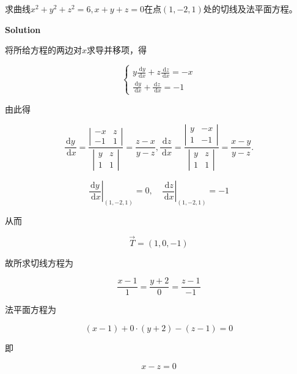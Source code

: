 \documentclass[12pt, a4paper]{article}
\numberwithin{equation}{section}
\begin{document}
    求曲线$x^2+y^2+z^2=6, x+y+z=0$在点\(\left(1,-2,1\right)\)处的切线及法平面方程。
    \vspace{1em}

    \textbf{Solution}
    \vspace{1em}

    将所给方程的两边对\(x\)求导并移项，得

    $$
        \left\{\begin{array}{l}
        y \frac{\mathrm{~d} y}{\mathrm{~d} x}+z \frac{\mathrm{~d} z}{\mathrm{~d} x}=-x \\
        \frac{\mathrm{~d} y}{\mathrm{~d} x}+\frac{\mathrm{d} z}{\mathrm{~d} x}=-1
        \end{array}\right.
    $$

    由此得

    $$
        \frac{\mathrm{d} y}{\mathrm{~d} x}=\frac{\left|\begin{array}{cc}
        -x & z \\
        -1 & 1
        \end{array}\right|}{\left|\begin{array}{ll}
        y & z \\
        1 & 1
        \end{array}\right|}=\frac{z-x}{y-z}, \frac{\mathrm{~d} z}{\mathrm{~d} x}=\frac{\left|\begin{array}{cc}
        y & -x \\
        1 & -1
        \end{array}\right|}{\left|\begin{array}{ll}
        y & z \\
        1 & 1
        \end{array}\right|}=\frac{x-y}{y-z} .
    $$

    $$
        \left.\frac{\mathrm{d} y}{\mathrm{~d} x}\right|_{(1,-2,1)}=0,\quad \left.\frac{\mathrm{~d} z}{\mathrm{~d} x}\right|_{(1,-2,1)}=-1
    $$

    从而

    $$
        \overrightarrow{T}=(1,0,-1)
    $$

    故所求切线方程为

    $$
        \frac{x-1}{1}=\frac{y+2}{0}=\frac{z-1}{-1}
    $$

    法平面方程为

    $$
        (x-1)+0 \cdot(y+2)-(z-1)=0
    $$

    即

    $$
        x-z = 0
    $$
\end{document}
